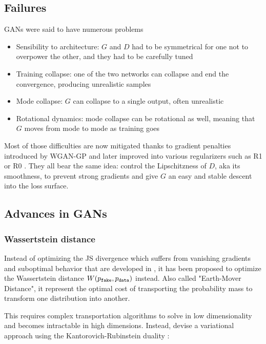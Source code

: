 \subsection{Failures}

\acp{GAN} were said to have numerous problems

\begin{itemize}
    \item Sensibility to architecture: $G$ and $D$ had to be symmetrical for one not to overpower the other, and they had to be carefully tuned
    \item Training collapse: one of the two networks can collapse and end the convergence, producing unrealistic samples
    \item Mode collapse: $G$ can collapse to a single output, often unrealistic
    \item Rotational dynamics: mode collapse can be rotational as well, meaning that $G$ moves from mode to mode as training goes
\end{itemize}

Most of those difficulties are now mitigated thanks to gradient penalties introduced by \ac{WGAN-GP} \citep{wgangp} and later improved into various regularizers such as R1 \citep{R1} or R0 \citep{0-GP}. They all bear the same idea: control the Lipschitzness of $D$, aka its smoothness, to prevent strong gradients and give $G$ an easy and stable descent into the loss surface.

\subsection{Advances in \acp{GAN}}

\subsubsection{Wassertstein distance}

Instead of optimizing the JS divergence which suffers from vanishing gradients and suboptimal behavior that are developed in \citet{wgan}, it has been proposed to optimize the Wassertstein distance $W(p_\texttt{fake}, p_\texttt{data})$ instead. Also called "Earth-Mover Distance", it represent the optimal cost of transporting the probability mass to transform one distribution into another.

This requires complex transportation algorithms to solve in low dimensionality and becomes intractable in high dimensions. Instead, \citet{wgan} devise a variational approach using the Kantorovich-Rubinstein duality \citep{kantorovich}:

